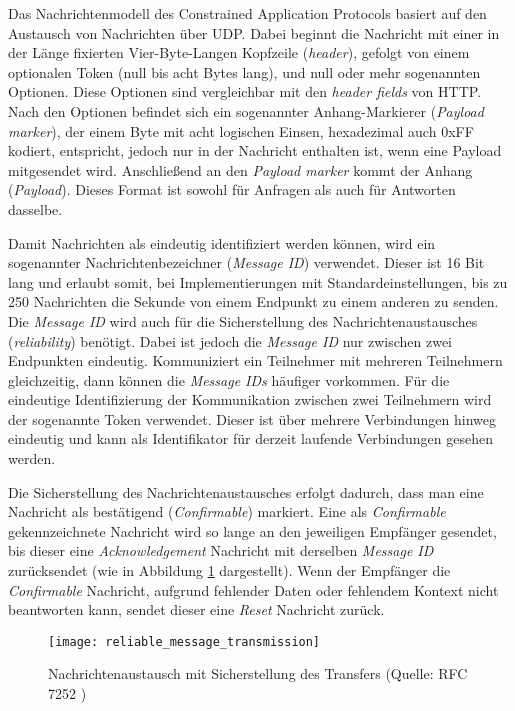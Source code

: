 Das Nachrichtenmodell des Constrained Application Protocols basiert auf den Austausch von Nachrichten über UDP. Dabei beginnt die Nachricht mit einer in der Länge fixierten Vier-Byte-Langen Kopfzeile (\textit{header}), gefolgt von einem optionalen Token (null bis acht Bytes lang), und null oder mehr sogenannten Optionen. Diese Optionen sind vergleichbar mit den \textit{header fields} von HTTP. Nach den Optionen befindet sich ein sogenannter Anhang-Markierer (\textit{Payload marker}), der einem Byte mit acht logischen Einsen, hexadezimal auch 0xFF kodiert, entspricht, jedoch nur in der Nachricht enthalten ist, wenn eine Payload mitgesendet wird. Anschließend an den \textit{Payload marker} kommt der Anhang (\textit{Payload}). Dieses Format ist sowohl für Anfragen als auch für Antworten dasselbe.

Damit Nachrichten als eindeutig identifiziert werden können, wird ein sogenannter Nachrichtenbezeichner (\textit{Message ID}) verwendet. Dieser ist 16 Bit lang und erlaubt somit, bei Implementierungen mit Standardeinstellungen, bis zu 250 Nachrichten die Sekunde von einem Endpunkt zu einem anderen zu senden. Die \textit{Message ID} wird auch für die Sicherstellung des Nachrichtenaustausches (\textit{reliability}) benötigt. Dabei ist jedoch die \textit{Message ID} nur zwischen zwei Endpunkten eindeutig. Kommuniziert ein Teilnehmer mit mehreren Teilnehmern gleichzeitig, dann können die \textit{Message IDs} häufiger vorkommen. Für die eindeutige Identifizierung der Kommunikation zwischen zwei Teilnehmern wird der sogenannte Token verwendet. Dieser ist über mehrere Verbindungen hinweg eindeutig und kann als Identifikator für derzeit laufende Verbindungen gesehen werden.

Die Sicherstellung des Nachrichtenaustausches erfolgt dadurch, dass man eine Nachricht als bestätigend (\textit{Confirmable}) markiert. Eine als \textit{Confirmable} gekennzeichnete Nachricht wird so lange an den jeweiligen Empfänger gesendet, bis dieser eine \textit{Acknowledgement} Nachricht mit derselben \textit{Message ID} zurücksendet (wie in Abbildung \ref{fig:nachrichtenaustausch-mit-sicherstellung-des-transfers} dargestellt). Wenn der Empfänger die \textit{Confirmable} Nachricht, aufgrund fehlender Daten oder fehlendem Kontext nicht beantworten kann, sendet dieser eine \textit{Reset} Nachricht zurück.

\begin{figure}[h]
    \centering
    \texttt{[image: reliable\_message\_transmission]}
    \caption{Nachrichtenaustausch mit Sicherstellung des Transfers (Quelle: RFC 7252 \autocite{RFC7252})}
    \label{fig:nachrichtenaustausch-mit-sicherstellung-des-transfers}
\end{figure}

